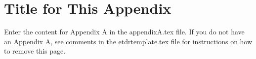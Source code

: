 
\cleardoublepage

\chapter{Title for This Appendix}

\label{Appendix:Key1}

Enter the content for Appendix A in the appendixA.tex file.  If you do not have an Appendix A, see comments in the etdrtemplate.tex file for instructions on how to remove this page.

